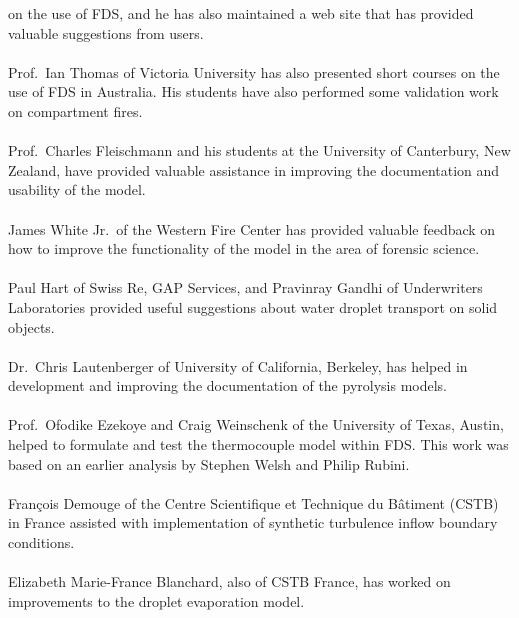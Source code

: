 \documentclass[11pt]{book}
\begin{document}
on the use of FDS, and he has also maintained a web site that has provided valuable suggestions from users.\\
\\
\noindent Prof.~Ian Thomas of Victoria University has also presented short courses on the use of FDS in Australia.
His students have also performed some validation work on compartment fires.\\
\\
\noindent Prof.~Charles Fleischmann and his students at the University of Canterbury, New Zealand, have provided valuable assistance
in improving the documentation and usability of the model.\\
\\
\noindent James White Jr.~of the Western Fire Center has provided valuable feedback on how to
improve the functionality of the model in the area of forensic science.\\
\\
\noindent Paul Hart of Swiss Re, GAP Services, and Pravinray Gandhi of Underwriters Laboratories provided useful suggestions about
water droplet transport on solid objects.\\
\\
\noindent Dr.~Chris Lautenberger of University of California, Berkeley, has helped in development and improving the documentation of the pyrolysis models.\\
\\
\noindent Prof.~Ofodike Ezekoye and Craig Weinschenk of the University of Texas, Austin, helped to formulate and test the thermocouple model within FDS. This work was based on an earlier analysis by Stephen Welsh and Philip Rubini.\\
\\
\noindent Fran\c{c}ois Demouge of the Centre Scientifique et Technique du B\^{a}timent (CSTB) in France assisted with implementation of synthetic turbulence inflow boundary conditions.\\
\\
\noindent Elizabeth Marie-France Blanchard, also of CSTB France, has worked on improvements to the droplet evaporation model.\\
\\



\setlength{\cftsecnumwidth}{0.45in}
\setlength{\cftsubsecnumwidth}{0.5in}
\setlength{\cftfignumwidth}{0.45in}
\setlength{\cfttabnumwidth}{0.45in}

\cleardoublepage
\tableofcontents
\end{document}
